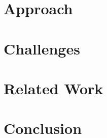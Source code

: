\documentclass[10pt,  twocolumn]{article}
\begin{document}
\section {Approach}

\section{Challenges}

	

%
%
%

\section{Related Work}
\label{sec:relatedwork}

\section{Conclusion}
\label{sec:conclusion}


%
%





\end{document}
